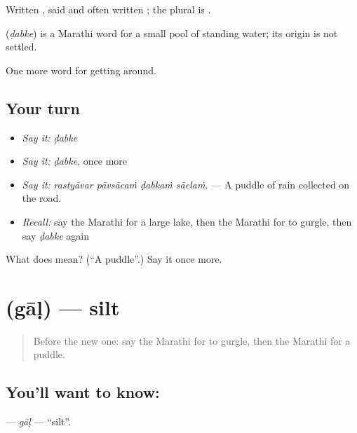Written , said and often written ; the plural is .

\begin{cousinweb}
\textbf{} (\emph{ḍabke}) is a Marathi word for a small pool of standing water; its origin is not settled.
\end{cousinweb}

\begin{grammarlens}[title={What you've built}]
One more word for getting around.
\end{grammarlens}

\subsection*{Your turn}
\begin{itemize}
\raggedright
  \item \emph{Say it:} \emph{ḍabke}
  \item \emph{Say it:} \emph{ḍabke}, once more
  \item \emph{Say it:} \emph{rastyāvar pāvsācaṁ ḍabkaṁ sāclaṁ.} — A puddle of rain collected on the road.
  \item \emph{Recall:} say the Marathi for a large lake, then the Marathi for to gurgle, then say \emph{ḍabke} again
\end{itemize}

\begin{tcolorbox}[breakable,colback=teal!4,colframe=teal!35!black,title={Before you move on}]
What does  mean? (\textquotedblleft{}A puddle\textquotedblright{}.) Say it once more.
\end{tcolorbox}
\section[\texorpdfstring{\mr{गाळ} (gāḷ)}{गाळ (gāḷ)}]{ (gāḷ) — silt}

\label{lesson:MR-C444-gal}



\begin{quote}
Before the new one: say the Marathi for to gurgle, then the Marathi for a puddle.
\end{quote}

\subsection*{You'll want to know: }
\textbf{} — \emph{gāḷ} — \textquotedblleft{}silt\textquotedblright{}.

